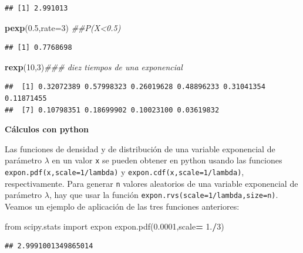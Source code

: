 \documentclass[]{book}
\newenvironment{Shaded}{\begin{snugshade}}{\end{snugshade}}
\newcommand{\CommentTok}[1]{\textcolor[rgb]{0.56,0.35,0.01}{\textit{#1}}}
\newcommand{\DataTypeTok}[1]{\textcolor[rgb]{0.13,0.29,0.53}{#1}}
\newcommand{\DecValTok}[1]{\textcolor[rgb]{0.00,0.00,0.81}{#1}}
\newcommand{\FloatTok}[1]{\textcolor[rgb]{0.00,0.00,0.81}{#1}}
\newcommand{\ImportTok}[1]{#1}
\newcommand{\KeywordTok}[1]{\textcolor[rgb]{0.13,0.29,0.53}{\textbf{#1}}}
\newcommand{\NormalTok}[1]{#1}
\newcommand{\OperatorTok}[1]{\textcolor[rgb]{0.81,0.36,0.00}{\textbf{#1}}}
\begin{document}
\begin{verbatim}
## [1] 2.991013
\end{verbatim}

\begin{Shaded}
\begin{Highlighting}[]
\KeywordTok{pexp}\NormalTok{(}\FloatTok{0.5}\NormalTok{,}\DataTypeTok{rate=}\DecValTok{3}\NormalTok{) }\CommentTok{##P(X<0.5)}
\end{Highlighting}
\end{Shaded}

\begin{verbatim}
## [1] 0.7768698
\end{verbatim}

\begin{Shaded}
\begin{Highlighting}[]
\KeywordTok{rexp}\NormalTok{(}\DecValTok{10}\NormalTok{,}\DecValTok{3}\NormalTok{)}\CommentTok{### diez tiempos de una exponencial}
\end{Highlighting}
\end{Shaded}

\begin{verbatim}
##  [1] 0.32072389 0.57998323 0.26019628 0.48896233 0.31041354 0.11871455
##  [7] 0.10798351 0.18699902 0.10023100 0.03619832
\end{verbatim}

\textbf{Cálculos con python}

Las funciones de densidad y de distribución de una variable exponencial de parámetro \(\lambda\) en un valor \texttt{x} se pueden obtener en python usando las funciones \texttt{expon.pdf(x,scale=1/lambda)} y \texttt{expon.cdf(x,scale=1/lambda)}, respectivamente. Para generar \texttt{n} valores aleatorios de una variable exponencial de parámetro \(\lambda\), hay que usar la función \texttt{expon.rvs(scale=1/lambda,size=n)}. Veamos un ejemplo de aplicación de las tres funciones anteriores:

\begin{Shaded}
\begin{Highlighting}[]
\ImportTok{from}\NormalTok{ scipy.stats }\ImportTok{import}\NormalTok{ expon}
\NormalTok{expon.pdf(}\FloatTok{0.0001}\NormalTok{,scale}\OperatorTok{=} \FloatTok{1.}\OperatorTok{/}\DecValTok{3}\NormalTok{)}
\end{Highlighting}
\end{Shaded}

\begin{verbatim}
## 2.9991001349865014
\end{verbatim}
\end{document}
